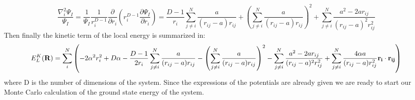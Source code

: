 \documentclass[10pt,a4paper,titlepage]{article}
\begin{document}
\begin{equation}
\frac{\nabla^2_{i} \Psi_I}{\Psi_I}=\frac{1}{\Psi_I}\frac{1}{r_i^{D-1}}\frac{\partial}{\partial r_i}\left(r_i^{D-1}\frac{\partial \Psi_I}{\partial r_i}\right) =\frac{D-1}{r_i}\sum_{j\neq i}^N \frac{a }{(r_{ij}-a )r_{ij}} + \left(\sum_{j\neq i}^N \frac{a}{(r_{ij}-a )r_{ij}}\right)^2 +\sum_{j\neq i}^N \frac{a^2 - 2 a r_{ij}}{( r_{ij}-a )^2r^2_{ij}}
\end{equation}
Then finally the kinetic term of the local energy is summarized in:
\begin{equation}
E_L^K({\bf R}) = \sum_i^N \left( -2 \alpha^2 r_i^2 + D \alpha - \frac{D-1}{2 r_i}\sum_{j\neq i}^N \frac{a }{(r_{ij}-a )r_{ij}} - \left(\sum_{j\neq i}^N \frac{a}{(r_{ij}-a )r_{ij}}\right)^2 -\sum_{j\neq i}^N \frac{a^2 - 2 a r_{ij}}{( r_{ij}-a )^2r^2_{ij}} + \sum_{j\neq i}^N \frac{4 \alpha a}{(r_{ij} -a)r_{ij}^2}{\bf r_i \cdot r_{ij}} \right)
\end{equation}
where D is the number of dimensions of the system. Since the expressions of the potentials are already given we are ready to start our Monte Carlo calculation of the ground state energy of the system.
\end{document}
